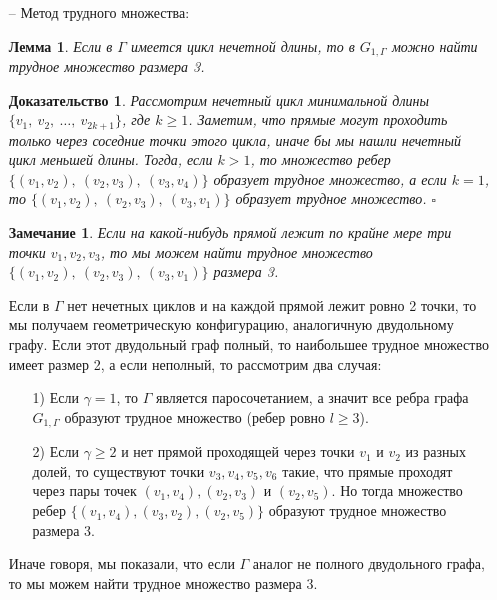 \documentclass[a4paper]{article}
\newtheorem*{mremark}{Замечание}
\newtheorem*{msolution}{Доказательство}
\newtheorem{mlemma}{Лемма}[section]
\begin{document}
\begin{itemize}[noitemsep]
    \item[--] Метод трудного множества:
    \begin{mlemma}
        Если в $\Gamma$ имеется цикл нечетной длины, то в $G_{1, \Gamma}$ можно найти трудное множество 
        размера 3.
    \end{mlemma}
    \begin{msolution}
        Рассмотрим нечетный цикл минимальной длины $\{v_1,\ v_2,\ \ldots,\ v_{2k+1}\}$, где $k \geq 1$.
        Заметим, что прямые могут проходить только через соседние точки этого цикла, иначе бы мы нашли 
        нечетный цикл меньшей длины. Тогда, если $k > 1$, то множество ребер $\{(v_1, v_2),\ (v_2, v_3),
        \ (v_3, v_4)\}$ образует трудное множество, а если $k = 1$, то $\{(v_1, v_2),\ (v_2, v_3),
        \ (v_3, v_1)\}$ образует трудное множество. $\square$
    \end{msolution}
    
    \begin{mremark}
        Если на какой-нибудь прямой лежит по крайне мере три точки $v_1, v_2, v_3$, то мы можем найти 
        трудное множество $\{(v_1, v_2),\ (v_2, v_3),\ (v_3, v_1)\}$ размера 3.
    \end{mremark}

     Если  в $\Gamma$ нет нечетных циклов и на каждой прямой лежит ровно 2 точки, то мы получаем 
     геометрическую конфигурацию, аналогичную двудольному графу. Если этот двудольный граф полный, 
     то наибольшее трудное множество имеет размер 2, а если неполный, то рассмотрим два случая:
     \begin{itemize}
         \item[1)] Если $\gamma = 1$, то $\Gamma$ является паросочетанием, а значит все ребра графа 
         $G_{1,\Gamma}$ образуют трудное множество (ребер ровно $l \geq 3$).
         \item[2)] Если $\gamma \geq 2$ и нет прямой проходящей через точки $v_1$ и $v_2$ из разных долей, 
         то существуют точки $v_3, v_4, v_5, v_6$ такие, что прямые проходят через пары точек $(v_1, v_4), 
         (v_2, v_3)$ и $(v_2, v_5)$. Но тогда множество ребер $\{(v_1, v_4), (v_3, v_2), (v_2, v_5)\}$ 
         образуют трудное множество размера 3.
     \end{itemize}
     Иначе говоря, мы показали, что если $\Gamma$ аналог не полного двудольного графа, то мы можем 
     найти трудное множество размера 3. 


\end{itemize}
\end{document}

